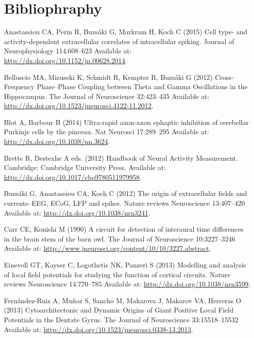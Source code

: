 \documentclass[]{article}
\begin{document}
\section*{Bibliophraphy}\label{bibliophraphy}

\hypertarget{refs}{}
\hypertarget{ref-Anastassiou2015Cell}{}
Anastassiou CA, Perin R, Buzsáki G, Markram H, Koch C (2015) Cell type-
and activity-dependent extracellular correlates of intracellular
spiking. Journal of Neurophysiology 114:608--623 Available at:
\url{http://dx.doi.org/10.1152/jn.00628.2014}.

\hypertarget{ref-Belluscio2012CrossFrequency}{}
Belluscio MA, Mizuseki K, Schmidt R, Kempter R, Buzsáki G (2012)
Cross-Frequency Phase--Phase Coupling between Theta and Gamma
Oscillations in the Hippocampus. The Journal of Neuroscience 32:423--435
Available at: \url{http://dx.doi.org/10.1523/jneurosci.4122-11.2012}.

\hypertarget{ref-Blot2014Ultrarapid}{}
Blot A, Barbour B (2014) Ultra-rapid axon-axon ephaptic inhibition of
cerebellar Purkinje cells by the pinceau. Nat Neurosci 17:289--295
Available at: \url{http://dx.doi.org/10.1038/nn.3624}.

\hypertarget{ref-Brette2012Handbook}{}
Brette R, Destexhe A eds. (2012) Handbook of Neural Activity
Measurement. Cambridge: Cambridge University Press. Available at:
\url{http://dx.doi.org/10.1017/cbo9780511979958}.

\hypertarget{ref-Buzsaki2012Origin}{}
Buzsáki G, Anastassiou CA, Koch C (2012) The origin of extracellular
fields and currents--EEG, ECoG, LFP and spikes. Nature reviews
Neuroscience 13:407--420 Available at:
\url{http://dx.doi.org/10.1038/nrn3241}.

\hypertarget{ref-carr90}{}
Carr CE, Konishi M (1990) A circuit for detection of interaural time
differences in the brain stem of the barn owl. The Journal of
Neuroscience 10:3227--3246 Available at:
\url{http://www.jneurosci.org/content/10/10/3227.abstract}.

\hypertarget{ref-Einevoll2013Modelling}{}
Einevoll GT, Kayser C, Logothetis NK, Panzeri S (2013) Modelling and
analysis of local field potentials for studying the function of cortical
circuits. Nature reviews Neuroscience 14:770--785 Available at:
\url{http://dx.doi.org/10.1038/nrn3599}.

\hypertarget{ref-FernandezRuiz2013Cytoarchitectonic}{}
Fernández-Ruiz A, Muñoz S, Sancho M, Makarova J, Makarov VA, Herreras O
(2013) Cytoarchitectonic and Dynamic Origins of Giant Positive Local
Field Potentials in the Dentate Gyrus. The Journal of Neuroscience
33:15518--15532 Available at:
\url{http://dx.doi.org/10.1523/jneurosci.0338-13.2013}.
\end{document}
